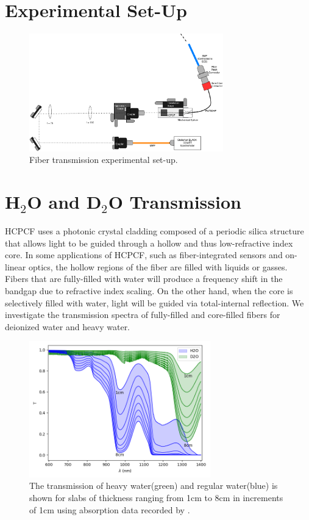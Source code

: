 \section{Experimental Set-Up}
\begin{figure}[!htb]
	\centering
	\includegraphics[width=0.75\textwidth]{./Figures/fiberfilling/scs_setup.png}
	\caption{Fiber transmission experimental set-up.}
	\label{fig:filling exp}
\end{figure}


\section{H${}_2$O and D${}_2$O Transmission}
HCPCF uses a photonic crystal cladding composed of a periodic silica structure that allows light to be guided through
a hollow and thus low-refractive index core. In some applications of HCPCF, such as fiber-integrated sensors and
on-linear optics, the hollow regions of the fiber are filled with liquids or gasses. Fibers that are fully-filled with water will  produce a frequency shift in the bandgap due to refractive index scaling\cite{antonopoulos}. On the other hand, when the core is selectively filled with water, light will be guided via total-internal reflection. We investigate the transmission spectra of fully-filled and core-filled fibers for deionized water and heavy water.
\begin{figure}[!htb]
	\centering
	\includegraphics[width=0.7\textwidth]{./Figures/fiberfilling/water_transmission/water_transmission.png}
	\caption{The transmission of heavy water(green) and regular water(blue) is shown for slabs of thickness ranging from 1cm to 8cm in increments of 1cm using absorption data recorded by \cite{kedenburg}. }
	\label{fig:water transmission}
\end{figure}
\clearpage

